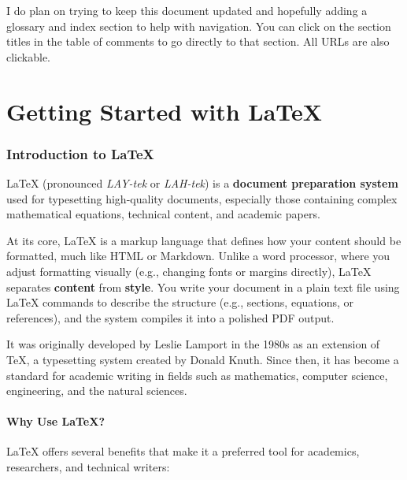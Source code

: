 \documentclass[12pt, oneside]{article}
\begin{document}
I do plan on trying to keep this document updated and hopefully adding a glossary and index section to help with navigation. You can click on the section titles in the table of comments to go directly to that section. All URLs are also clickable.

\newpage
\part{Getting Started with \LaTeX{}}

\section{Introduction to \LaTeX{}}\label{intro}

LaTeX (pronounced \textit{LAY-tek} or \textit{LAH-tek}) is a \textbf{document preparation system} used for typesetting high-quality documents, especially those containing complex mathematical equations, technical content, and academic papers.

At its core, LaTeX is a markup language that defines how your content should be formatted, much like HTML or Markdown. Unlike a word processor, where you adjust formatting visually (e.g., changing fonts or margins directly), LaTeX separates \textbf{content} from \textbf{style}. You write your document in a plain text file using LaTeX commands to describe the structure (e.g., sections, equations, or references), and the system compiles it into a polished PDF output.

It was originally developed by Leslie Lamport in the 1980s as an extension of TeX, a typesetting system created by Donald Knuth. Since then, it has become a standard for academic writing in fields such as mathematics, computer science, engineering, and the natural sciences.

\subsection{Why Use \LaTeX{}?}

\LaTeX{} offers several benefits that make it a preferred tool for academics, researchers, and technical writers:
\end{document}
